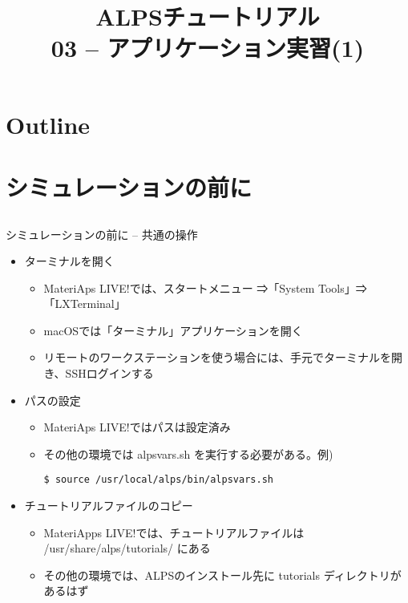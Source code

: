 
\title{ALPSチュートリアル \\ 03 -- アプリケーション実習(1)}




\begin{frame}
  \titlepage
\end{frame}

\section*{Outline}
\begin{frame}[t,fragile]
   \tableofcontents
\end{frame}

\section{シミュレーションの前に}

\subsection*{\redb\whiteb\greenm}
\begin{frame}[t,fragile]{シミュレーションの前に -- 共通の操作}
  \begin{itemize}
  \item ターミナルを開く
    \begin{itemize}
    \item \alert{MateriAps LIVE!では、スタートメニュー ⇒「System Tools」⇒「LXTerminal」}
    \item macOSでは「ターミナル」アプリケーションを開く
    \item リモートのワークステーションを使う場合には、手元でターミナルを開き、SSHログインする
    \end{itemize}

  \item パスの設定
    \begin{itemize}
    \item \alert{MateriAps LIVE!ではパスは設定済み}
    \item その他の環境では alpsvars.sh を実行する必要がある。例)
\begin{lstlisting}
$ source /usr/local/alps/bin/alpsvars.sh
\end{lstlisting}
    \end{itemize}
    
  \item チュートリアルファイルのコピー
    \begin{itemize}
    \item \alert{MateriApps LIVE!では、チュートリアルファイルは /usr/share/alps/tutorials/ にある}
    \item その他の環境では、ALPSのインストール先に tutorials ディレクトリがあるはず
    \end{itemize}
  \end{itemize}
\end{frame}


